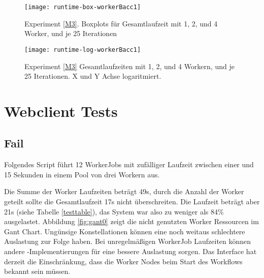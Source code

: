 \vspace*{\fill}

\begin{figure}[H]
  \centering
  \begin{minipage}[b]{0.45\textwidth}
    \texttt{[image: runtime-box-workerBacc1]}
    \caption{Experiment \ref{M3}. Boxplots für Gesamtlaufzeit mit 1, 2, und 4 Worker, und je 25 Iterationen}
    \label{runtime-box-workerBacc1}
  \end{minipage}
  \hfill
  \begin{minipage}[b]{0.45\textwidth}
    \texttt{[image: runtime-log-workerBacc1]}
    \caption{Experiment \ref{M3} Gesamtlaufzeiten mit 1, 2, und 4 Workern, und je 25 Iterationen. X und Y Achse logaritmiert.}
    \label{runtime-log-workerBacc1}
  \end{minipage}
\end{figure}





















\clearpage
\section{Webclient Tests}
\subsection{\scheduler{} Fail}
\label{schedulerNeeded}
Folgendes Script führt 12 WorkerJobs mit zufälliger Laufzeit zwischen einer und 15 Sekunden in einem Pool von drei Workern aus.

Die Summe der Worker Laufzeiten beträgt 49s, durch die Anzahl der Worker geteilt sollte die Gesamtlaufzeit 17s nicht überschreiten.
Die Laufzeit beträgt aber 21s (siehe Tabelle \ref{testtable}), das System war also zu weniger als 84\% ausgelastet.
Abbildung \ref{fig:gant0} zeigt die nicht genutzten Worker Ressourcen im Gant Chart.
Ungünsige Konstellationen können eine noch weitaus schlechtere Auslastung zur Folge haben.
Bei unregelmäßigen WorkerJob Laufzeiten können andere \scheduler -Implementierungen für eine bessere Auslastung sorgen.
Das \scheduler{} Interface hat derzeit die Einschränkung, dass die Worker Nodes beim Start des Workflows bekannt sein müssen.

